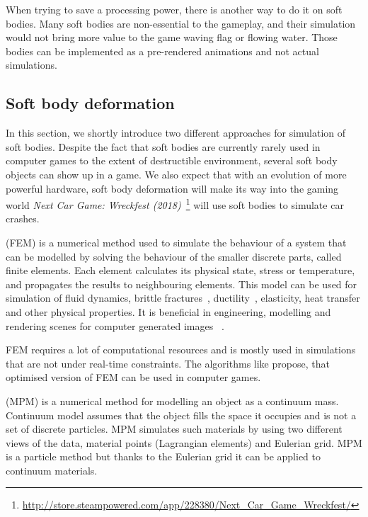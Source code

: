 When trying to save a processing power, there is another way to do it on soft bodies. Many soft bodies are non-essential to the gameplay, and their simulation would not bring more value to the game \eg waving flag or flowing water. Those bodies can be implemented as a pre-rendered animations and not actual simulations.

\subsection{Soft body deformation}
In this section, we shortly introduce two different approaches for simulation of soft bodies. Despite the fact that soft bodies are currently rarely used in computer games to the extent of destructible environment, several soft body objects can show up in a game. We also expect that with an evolution of more powerful hardware, soft body deformation will make its way into the gaming world \eg \emph{Next Car Game: Wreckfest (2018)}~\footnote{\url{http://store.steampowered.com/app/228380/Next\_Car\_Game\_Wreckfest/}} will use soft bodies to simulate car crashes.
\label{sec:softBody}

 (FEM) is a numerical method used to simulate the behaviour of a system that can be modelled by solving the behaviour of the smaller discrete parts, called finite elements. Each element calculates its physical state, \eg stress or temperature, and propagates the results to neighbouring elements. This model can be used for simulation of fluid dynamics, brittle fractures~\cite{brittlefracture}, ductility~\cite{ductilefracture}, elasticity, heat transfer and other physical properties. It is beneficial in engineering, modelling and rendering scenes for computer generated images ~\cite{Bargteil:2007:AFE}. 

FEM requires a lot of computational resources and is mostly used in simulations that are not under real-time constraints. The algorithms like \citet{femingames} propose, that optimised version of FEM can be used in computer games.


 (MPM) is a numerical method for modelling an object as a continuum mass. Continuum model assumes that the object fills the space it occupies and is not a set of discrete particles. MPM simulates such materials by using two different views of the data, material points (Lagrangian elements) and Eulerian grid. MPM is a particle method but thanks to the Eulerian grid it can be applied to continuum materials. 

